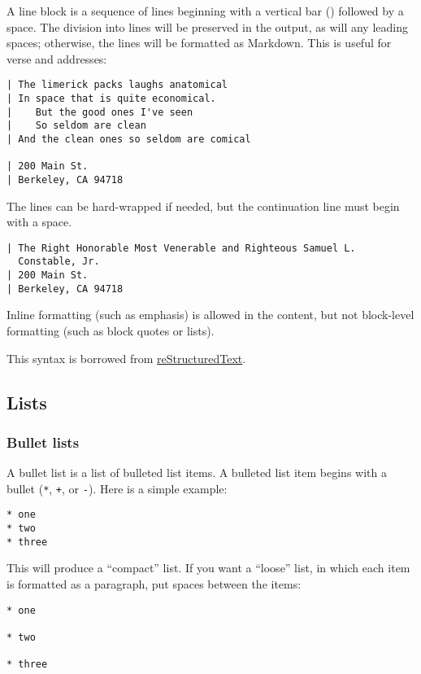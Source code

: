 \documentclass[
  a4paper,
]{article}
\begin{document}
A line block is a sequence of lines beginning with a vertical bar
(\texttt{\textbar{}}) followed by a space. The division into lines will
be preserved in the output, as will any leading spaces; otherwise, the
lines will be formatted as Markdown. This is useful for verse and
addresses:

\begin{verbatim}
| The limerick packs laughs anatomical
| In space that is quite economical.
|    But the good ones I've seen
|    So seldom are clean
| And the clean ones so seldom are comical

| 200 Main St.
| Berkeley, CA 94718
\end{verbatim}

The lines can be hard-wrapped if needed, but the continuation line must
begin with a space.

\begin{verbatim}
| The Right Honorable Most Venerable and Righteous Samuel L.
  Constable, Jr.
| 200 Main St.
| Berkeley, CA 94718
\end{verbatim}

Inline formatting (such as emphasis) is allowed in the content, but not
block-level formatting (such as block quotes or lists).

This syntax is borrowed from
\href{https://docutils.sourceforge.io/docs/ref/rst/introduction.html}{reStructuredText}.

\hypertarget{lists}{%
\subsection{Lists}\label{lists}}

\hypertarget{bullet-lists}{%
\subsubsection{Bullet lists}\label{bullet-lists}}

A bullet list is a list of bulleted list items. A bulleted list item
begins with a bullet (\texttt{*}, \texttt{+}, or \texttt{-}). Here is a
simple example:

\begin{verbatim}
* one
* two
* three
\end{verbatim}

This will produce a ``compact'' list. If you want a ``loose'' list, in
which each item is formatted as a paragraph, put spaces between the
items:

\begin{verbatim}
* one

* two

* three
\end{verbatim}
\end{document}
